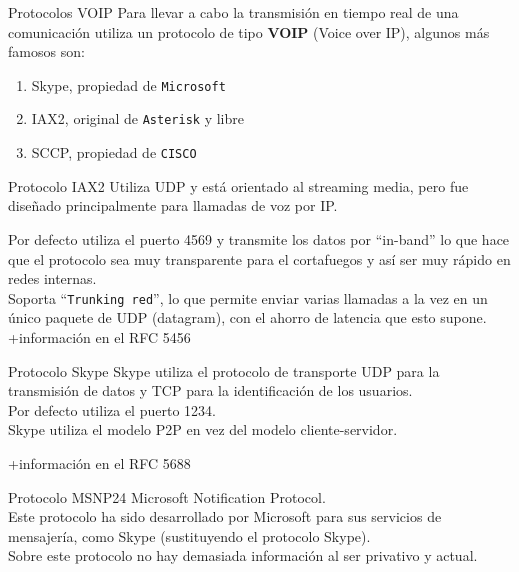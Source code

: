 \documentclass[11pt]{beamer}
\begin{document}
\begin{frame}{Protocolos VOIP}
Para llevar a cabo la transmisión en tiempo real de una comunicación 
utiliza un protocolo de tipo \textbf{VOIP} (Voice over IP), algunos más
famosos son:
\vspace*{0.5cm}
\begin{enumerate}
\item Skype, propiedad de \texttt{Microsoft}
\item IAX2, original de \texttt{Asterisk} y libre
\item SCCP, propiedad de \texttt{CISCO}
\end{enumerate}
\end{frame}

\begin{frame}{Protocolo IAX2}
Utiliza UDP y está orientado al streaming media, pero fue diseñado principalmente para llamadas de voz por IP.\\
\vspace*{1cm}

Por defecto utiliza el puerto 4569 y transmite los datos por ``in-band'' 
lo que hace que el protocolo sea muy transparente para el cortafuegos y
 así ser muy rápido en redes internas.\\
\vspace*{0.5cm}
Soporta ``\texttt{Trunking red}'', lo que permite enviar varias llamadas a la vez en un único paquete de UDP (datagram), con el ahorro de latencia que esto supone. \\
\vspace*{0.5cm}
+información en el RFC 5456
\end{frame}

\begin{frame}{Protocolo Skype}
Skype utiliza el protocolo de transporte UDP para la transmisión de datos y TCP para la identificación de los usuarios. \\
\vspace*{0.3cm}
Por defecto utiliza el puerto 1234.\\
\vspace*{0.3cm}
Skype utiliza el modelo P2P en vez del modelo cliente-servidor.

\vspace*{1cm}
+información en el RFC 5688
\end{frame}

\begin{frame}{Protocolo MSNP24}
Microsoft Notification Protocol. \\
\vspace*{0.3cm}
Este protocolo ha sido desarrollado por Microsoft para sus servicios de mensajería, como Skype (sustituyendo el protocolo Skype).\\
\vspace*{0.3cm}
Sobre este protocolo no hay demasiada información al ser privativo y actual.
\end{frame}
\end{document}
